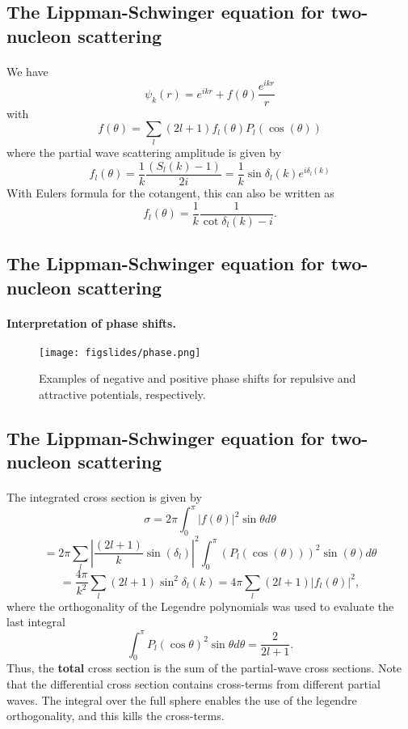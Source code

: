 \documentclass[%
twoside,                 %
final,                   %
10pt]{article}
\begin{document}
\subsection*{The Lippman-Schwinger equation for two-nucleon scattering}

\paragraph{}
We have
\[
\psi_k(r) = e^{ikr} + f(\theta) \frac{e^{ikr}}{r}
\]
with 
\[
f(\theta) = \sum_l (2l+1)f_l(\theta) P_l(\cos(\theta))
\]
where the partial wave scattering amplitude is given by
\[
f_l(\theta) = \frac{1}{k}\frac{(S_l(k)-1)}{2i} = \frac{1}{k}\sin\delta_l(k) e^{i\delta_l(k)}
\]
With Eulers formula for the cotangent, this can also be written as
\[
f_l(\theta) = \frac{1}{k}\frac{1}{\cot \delta_l(k) - i}.
\]



\subsection*{The Lippman-Schwinger equation for two-nucleon scattering}

\paragraph{Interpretation of phase shifts.}

\begin{figure}[ht]
  \centerline{\texttt{[image: figslides/phase.png]}}
  \caption{
  Examples of negative and positive phase shifts for repulsive and attractive potentials, respectively.
  }
\end{figure}



\subsection*{The Lippman-Schwinger equation for two-nucleon scattering}

\paragraph{}
The integrated cross section is given by
\[
\sigma = 2\pi \int_0^{\pi} |f(\theta)|^2 \sin \theta d\theta 
\]
\[
=2\pi \sum_l |\frac{(2l+1)}{k} \sin(\delta_l)|^2 \int_0^{\pi} (P_l(\cos(\theta)))^2 \sin(\theta) d\theta\]
\[ 
= \frac{4\pi}{k^2} \sum_l (2l+1) \sin^2\delta_l(k) = 4\pi \sum_l (2l+1)|f_l(\theta)|^2, 
\]
where the orthogonality of the Legendre polynomials was used to evaluate the last integral
\[
\int_0^{\pi} P_l(\cos \theta)^2 \sin \theta d\theta = \frac{2}{2l+1}.
\]
Thus, the \textbf{total} cross section is the sum of the partial-wave cross sections. Note that the differential cross section contains cross-terms from different partial waves. The integral over the full sphere enables the use of the legendre orthogonality, and this kills the cross-terms.
\end{document}
